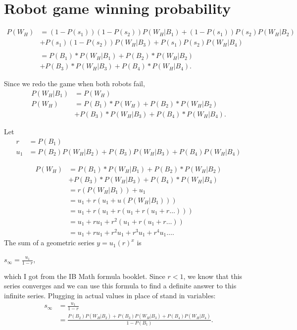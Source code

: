 \documentclass[11pt]{article}
\begin{document}
\section{Robot game winning probability}


\begin{align*}
    P(W_{H})&= (1-P(s_1))(1-P(s_2))P(W_H | B_1) + (1-P(s_1))P(s_2)P(W_H | B_2)\\
    &+ P(s_1)(1-P(s_2))P(W_H | B_3) + P(s_1)P(s_2)P(W_H | B_4)\\
    \\
    &= P(B_{1}) * P(W_{H} | B_{1}) + P(B_{2}) * P(W_{H} | B_{2}) \\
    &+ P(B_{3}) * P(W_{H} | B_{3}) + P(B_{4}) * P(W_{H} | B_{4}).
\end{align*}

Since we redo the game when both robots fail, 
\begin{align*}
    P(W_H | B_1) &= P(W_{H})\\
    P(W_H) &= P(B_{1}) * P(W_{H}) + P(B_{2}) * P(W_{H} | B_{2})\\
    &+ P(B_{3}) * P(W_{H} | B_{3}) + P(B_{4}) * P(W_{H} | B_{4}).
\end{align*}

Let
\begin{align*}
    r &= P(B_1)\\
    u_1 &= P(B_2)P(W_H | B_2) + P(B_3)P(W_H | B_3) + P(B_4)P(W_H | B_4)
\end{align*}



\begin{align*}
    P(W_H) &= P(B_{1}) * P(W_{H} | B_{1}) + P(B_{2}) * P(W_{H} | B_{2})\\
    &+ P(B_{3}) * P(W_{H} | B_{3}) + P(B_{4}) * P(W_{H} | B_{4})\\
    &= r(P(W_{H} | B_1)) + u_1\\
    &= u_1 + r(u_1 + u(P(W_{H} | B_1)))\\
    &= u_1 + r(u_1 + r(u_1 + r(u_1 + r\dots)))\\
    &= u_1 + ru_1 + r^2(u_1 + r(u_1 + r\dots))\\
    &= u_1 + ru_1 + r^2 u_1 + r^3 u_1 + r^4 u_1\dots.
\end{align*}
The sum of a geometric series \(y = u_1 (r)^x \) is

\(s_{\infty} = \frac{u_1}{1-r}\),

which I got from the IB Math formula booklet. Since \(r < 1 \), we know that this
series converges and we can use this formula to find a definite answer to this infinite series.
Plugging in actual values in place of stand in variables:
\begin{align*}
    s_{\infty} &= \frac{u_1}{1-r}\\
    &= \frac{P(B_2)P(W_H | B_2) + P(B_3)P(W_H | B_3) + P(B_4)P(W_H | B_4)}{1-P(B_1)}.
\end{align*}
\end{document}
